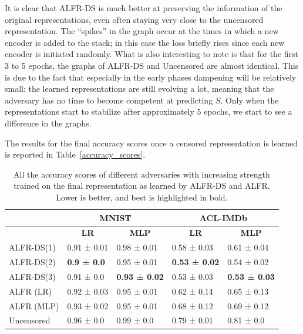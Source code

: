 \documentclass[nohyperref]{article}
\theoremstyle{plain}
\theoremstyle{definition}
\theoremstyle{remark}
\begin{document}
It is clear that ALFR-DS is much better at preserving the information of the original representations, even often staying very close to the uncensored representation. The ``spikes'' in the graph occur at the times in which a new encoder is added to the stack; in this case the loss briefly rises since each new encoder is initiated randomly. What is also interesting to note is that for the first 3 to 5 epochs, the graphs of ALFR-DS and Uncensored are almost identical. This is due to the fact that especially in the early phases dampening will be relatively small: the learned representations are still evolving a lot, meaning that the adversary has no time to become competent at predicting $S$. Only when the representations start to stabilize after approximately 5 epochs, we start to see a difference in the graphs.

The results for the final accuracy scores once a censored representation is learned is reported in Table~\ref{accuracy_scores}.
\begin{table}[t]
\label{accuracy_scores}
\caption{All the accuracy scores of different adversaries with increasing strength trained on the final representation as learned by ALFR-DS and ALFR. Lower is better, and best is highlighted in bold.}
\label{sample-table}
\vskip 0.15in
\begin{center}
\begin{small}
\addtolength{\tabcolsep}{-2pt}
\begin{tabular}{l|ll|ll}
\toprule
{} & \multicolumn{2}{c|}{\textbf{MNIST}} & \multicolumn{2}{c}{\textbf{ACL-IMDb}} \\
\midrule
{} & \multicolumn{1}{c}{\textbf{LR}} & \multicolumn{1}{c|}{\textbf{MLP}} & \multicolumn{1}{c}{\textbf{LR}} & \multicolumn{1}{c}{\textbf{MLP}} \\
\midrule
\tiny{ALFR-DS(1)} &  0.91 ± 0.01 &  0.98 ± 0.01 &  0.58 ± 0.03 &  0.61 ± 0.04 \\
\tiny{ALFR-DS(2)} &    \textbf{0.9 ± 0.0} &  0.95 ± 0.01 &  \textbf{0.53 ± 0.02} &  0.54 ± 0.02 \\
\tiny{ALFR-DS(3)} &   0.91 ± 0.0 &  \textbf{0.93 ± 0.02} &  0.53 ± 0.03 &  \textbf{0.53 ± 0.03} \\
\tiny{ALFR (LR)}  &  0.92 ± 0.03 &  0.95 ± 0.01 &  0.62 ± 0.14 &  0.65 ± 0.13 \\
\tiny{ALFR (MLP)} &  0.93 ± 0.02 &  0.95 ± 0.01 &  0.68 ± 0.12 &  0.69 ± 0.12 \\
\tiny{Uncensored} &   0.96 ± 0.0 &   0.99 ± 0.0 &  0.79 ± 0.01 &   0.81 ± 0.0 \\
\bottomrule
\end{tabular}
\end{small}
\end{center}
\vskip -0.1in
\end{table}
\end{document}

